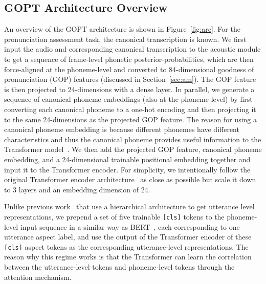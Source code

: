 \documentclass{article}
\newcommand{\squeezeup}{\vspace{-1.6mm}}
\begin{document}
\squeezeup\squeezeup
\subsection{GOPT Architecture Overview}
An overview of the GOPT architecture is shown in Figure~\ref{fig:arc}. For the pronunciation assessment task, the canonical transcription is known. We first input the audio and corresponding canonical transcription to the acoustic module to get a sequence of frame-level phonetic posterior-probabilities, which are then force-aligned at the phoneme-level and converted to 84-dimensional goodness of pronunciation (GOP) features (discussed in Section~\ref{sec:am}). The GOP feature is then projected to 24-dimensions with a dense layer. In parallel, we generate a sequence of canonical phoneme embeddings (also at the phoneme-level) by first converting each canonical phoneme to a one-hot encoding and then projecting it to the same 24-dimensions as the projected GOP feature. The reason for using a canonical phoneme embedding is because different phonemes have different characteristics and thus the canonical phoneme provides useful information to the Transformer model~\cite{lin2021deep}. We then add the projected GOP feature, canonical phoneme embedding, and a 24-dimensional trainable positional embedding together and input it to the Transformer encoder. For simplicity, we intentionally follow the original Transformer encoder architecture~\cite{vaswani2017attention} as close as possible but scale it down to 3 layers and an embedding dimension of 24. 

Unlike previous work~\cite{lin2020automatic,lin2021deep} that use a hierarchical architecture to get utterance level representations, we prepend a set of five trainable \texttt{[cls]} tokens to the phoneme-level input sequence in a similar way as BERT~\cite{devlin2018bert}, each corresponding to one utterance aspect label, and use the output of the Transformer encoder of these \texttt{[cls]} aspect tokens as the corresponding utterance-level representations. The reason why this regime works is that the Transformer can learn the correlation between the utterance-level tokens and phoneme-level tokens through the attention mechanism.
\end{document}
